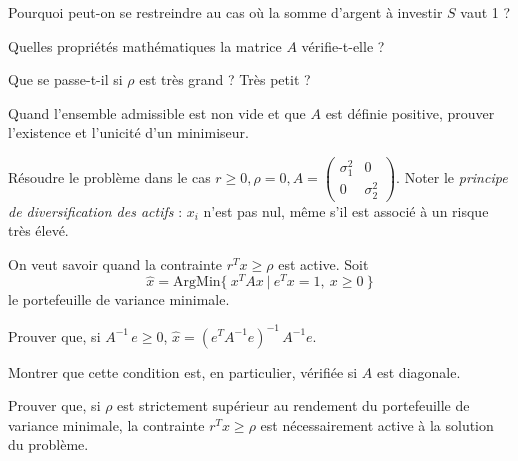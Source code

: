 \documentclass[10pt,a4paper,fleqn]{report}
\begin{document}
\begin{exercice}
\begin{questions}
\item Pourquoi peut-on se restreindre au cas où la somme d'argent à
  investir $S$ vaut 1 ?
\item Quelles propriétés mathématiques la matrice $A$ vérifie-t-elle ?
\item Que se passe-t-il si $\rho$ est très grand ? Très petit ?
\item Quand l'ensemble admissible est non vide et que $A$ est
      d\'efinie positive, prouver l'existence et l'unicit\'e d'un minimiseur.
\item Résoudre le problème dans le cas $r \geq 0, \rho = 0, A =
  \begin{pmatrix}
    \sigma_{1}^{2}&0\\0&\sigma_{2}^{2}
  \end{pmatrix}$. Noter le \textit{principe de diversification des
    actifs} : $x_{i}$ n'est pas nul, même s'il est associé à un risque
  très élevé.
\end{questions}
\end{exercice}

\begin{exercice}
  On veut savoir quand la contrainte $r^{T} x \geq \rho$ est
  active. Soit $$\hat x= \mathrm{ArgMin} \{\ x^{T} A x\ |\ e^{T} x=1, \
  x\geq 0\ \}$$ le portefeuille de variance minimale.
\begin{questions}
\item Prouver que, si $A^{-1}\,e\geq 0$, $\hat x=(e^{T} A^{-1} e)^{-1}\,A^{-1}e$.
\item Montrer que cette condition est, en particulier, v\'erifi\'ee si $A$ est diagonale.
\item Prouver que, si $\rho$ est strictement sup\'erieur au rendement du portefeuille de variance minimale, la contrainte $r^{T} x \geq \rho$ est n\'ecessairement active \`a la solution du probl\`eme.
\end{questions}
\end{exercice}
\end{document}
